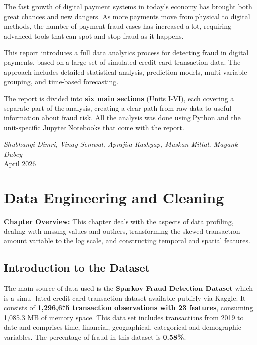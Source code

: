 \documentclass[12pt,a4paper]{report}
\begin{document}
The fast growth of digital payment systems in today's economy has brought both great chances and new dangers. As more payments move from physical to digital methods, the number of payment fraud cases has increased a lot, requiring advanced tools that can spot and stop fraud as it happens.

This report introduces a full data analytics process for detecting fraud in digital payments, based on a large set of simulated credit card transaction data.
The approach includes detailed statistical analysis, prediction models, multi-variable grouping, and time-based forecasting.

The report is divided into \textbf{six main sections} (Units I-VI), each covering a separate part of the analysis, creating a clear path from raw data to useful information about fraud risk.
All the analysis was done using Python and the unit-specific Jupyter Notebooks that come with the report.

\vspace{0.8cm}
\begin{flushright}
\textit{Shubhangi Dimri, Vinay Semwal, Aprajita Kashyap, Muskan Mittal, Mayank Dubey}\\
April 2026
\end{flushright}

\chapter{Data Engineering and Cleaning}
\textbf{Chapter Overview:} This chapter deals with the aspects of data profiling, dealing with missing values and outliers, transforming the skewed transaction amount variable to the log scale, and constructing temporal and spatial features.

\section{Introduction to the Dataset}

The main source of data used is the \textbf{Sparkov Fraud Detection Dataset} which is a simu-
lated credit card transaction dataset available publicly via Kaggle. It consists of \textbf{1,296,675 transaction observations with 23 features}, consuming 1,085.3 MB of memory space. This data set includes transactions from 2019 to date and comprises time, financial, geographical, categorical and demographic variables. The percentage of fraud in this dataset is \textbf{0.58\%}.
\end{document}
